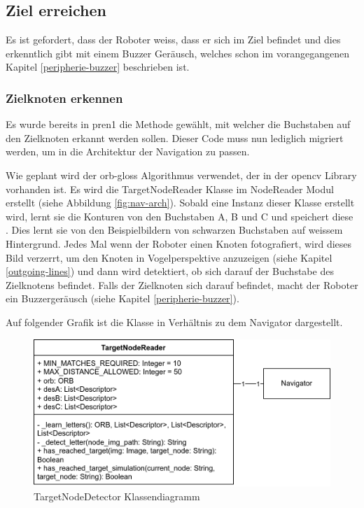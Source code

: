 \subsection{Ziel erreichen}

Es ist gefordert, dass der Roboter weiss, dass er sich im Ziel befindet und dies erkenntlich gibt mit einem Buzzer Geräusch, welches schon im vorangegangenen Kapitel \ref{peripherie-buzzer} beschrieben ist.

\subsubsection{Zielknoten erkennen}
\label{detect-target}

Es wurde bereits in \acrshort{pren1} die Methode gewählt, mit welcher die Buchstaben auf den Zielknoten erkannt werden sollen. Dieser Code muss nun lediglich migriert werden, um in die Architektur der Navigation zu passen.

Wie geplant wird der \gls{orb-gloss} Algorithmus verwendet, der in der \gls{opencv} Library vorhanden ist. Es wird die TargetNodeReader Klasse im NodeReader Modul erstellt (siehe Abbildung \ref{fig:nav-arch}). Sobald eine Instanz dieser Klasse erstellt wird, lernt sie die Konturen von den Buchstaben A, B und C und speichert diese .
Dies lernt sie von den Beispielbildern von schwarzen Buchstaben auf weissem Hintergrund.
Jedes Mal wenn der Roboter einen Knoten fotografiert, wird dieses Bild verzerrt, um den Knoten in Vogelperspektive anzuzeigen (siehe Kapitel \ref{outgoing-lines}) und dann wird detektiert, ob sich darauf der Buchstabe des Zielknotens befindet. Falls der Zielknoten sich darauf befindet, macht der Roboter ein Buzzergeräusch (siehe Kapitel \ref{peripherie-buzzer}).

Auf folgender Grafik ist die Klasse in Verhältnis zu dem Navigator dargestellt.

\begin{figure}[H]
\centering
\includegraphics[width=\textwidth]{assets/IT/robot-sw-architecture-target-node-detector.png}
\caption{TargetNodeDetector Klassendiagramm}
\label{fig:target-node-nav}
\end{figure}

